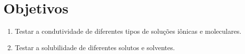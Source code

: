 \chapter{Objetivos}

\begin{enumerate}
 \item Testar a condutividade de diferentes tipos de soluções iônicas e moleculares.
 \item Testar a solubilidade de diferentes solutos e solventes.
\end{enumerate}
